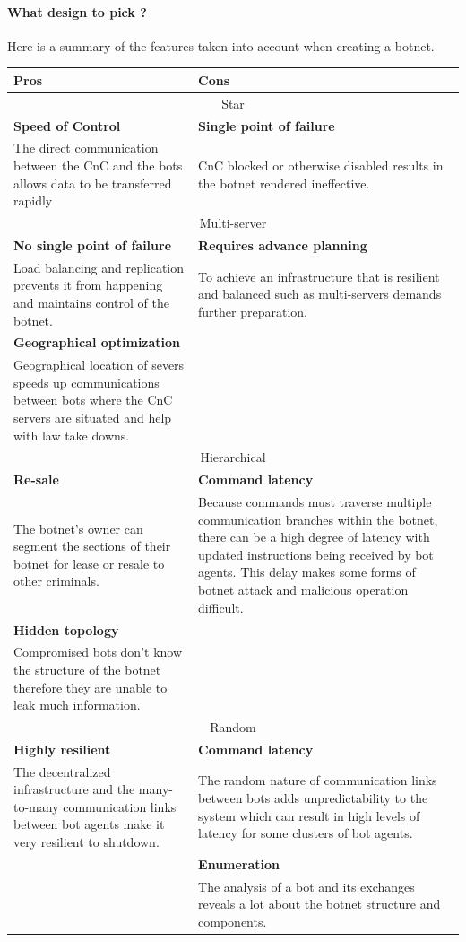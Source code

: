 \paragraph{What design to pick ?} Here is a summary of the features taken into account when creating a botnet.\\
\begin{tabular}{|p{7cm}|p{7cm}|}
\hline
Pros & Cons \\
\hline
\multicolumn{2}{|c|}{Star}\\
\hline
\textbf{Speed of Control} &\textbf{ Single point of failure}\\
The direct communication between the CnC and the bots allows data to be transferred rapidly & CnC blocked or otherwise disabled results in the botnet rendered ineffective.\\
\hline
\multicolumn{2}{|c|}{Multi-server}\\
\hline
\textbf{No single point of failure} & \textbf{Requires advance planning}\\
Load balancing and replication prevents it from happening and maintains control of the botnet. & To achieve an infrastructure that is resilient and balanced such as multi-servers demands further preparation.\\
\textbf{Geographical optimization} & \\
Geographical location of severs speeds up communications between bots where the CnC servers are situated and help with law take downs.&\\
\hline
\multicolumn{2}{|c|}{Hierarchical}\\
\hline
\textbf{Re-sale} & \textbf{Command latency}\\
The botnet's owner can segment the sections of their botnet for lease or resale to other criminals. & Because commands must traverse
multiple communication branches within the botnet, there can be a high degree of latency with updated instructions being received by bot agents. This delay makes some forms of botnet attack and malicious operation difficult.\\
\textbf{Hidden topology} &\\
Compromised bots don't know the structure of the botnet therefore they are unable to leak much information.& \\
\hline
\multicolumn{2}{|c|}{Random}\\
\hline
\textbf{Highly resilient} & \textbf{Command latency}\\
The decentralized infrastructure and the many-to-many communication links between bot agents make it very resilient to shutdown. & The random nature of communication links between bots adds unpredictability to the system which can result in high levels of latency for some clusters of bot agents.\\
& \textbf{Enumeration}\\
& The analysis of a bot and its exchanges reveals a lot about the botnet structure and components.\\
\hline
\end{tabular}

